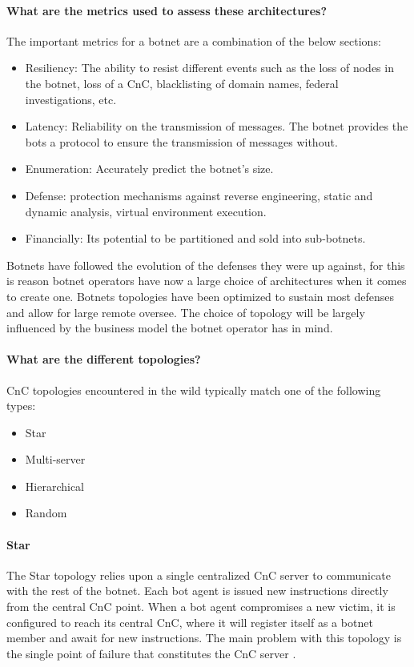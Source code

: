 \paragraph{What are the metrics used to assess these architectures?}
The important metrics for a botnet are a combination of the below sections:
\begin{itemize}[noitemsep]
\item Resiliency: The ability to resist different events such as the loss of nodes in the botnet, loss of a CnC, blacklisting of domain names, federal investigations, etc.
\item Latency: Reliability on the transmission of messages. The botnet provides the bots a protocol to ensure the transmission of messages without.
\item Enumeration: Accurately predict the botnet's size.
\item Defense: protection mechanisms against reverse engineering, static and dynamic analysis, virtual environment execution.
\item Financially: Its potential to be partitioned and sold into sub-botnets. 
\end{itemize}

Botnets have followed the evolution of the defenses they were up against, for this is reason botnet operators have now a large choice of architectures when it comes to create one. Botnets topologies have been optimized to sustain most defenses and allow for large remote oversee. The choice of topology will be largely influenced by the business model the botnet operator has in mind.

\paragraph{What are the different topologies?}
CnC topologies encountered in the wild typically match one of the following types:
\begin{itemize}[noitemsep]
\item Star
\item Multi-server
\item Hierarchical
\item Random
\end{itemize}

\paragraph{Star}
The Star topology relies upon a single centralized CnC server to communicate with the rest of the botnet. Each bot agent is issued new instructions directly from the central CnC point\cite{bot-com}. When a bot agent compromises a new victim, it is configured to reach its central CnC, where it will register itself as a botnet member and await for new instructions. The main problem with this topology is the single point of failure that constitutes the CnC server \cite{bot-intro}.

